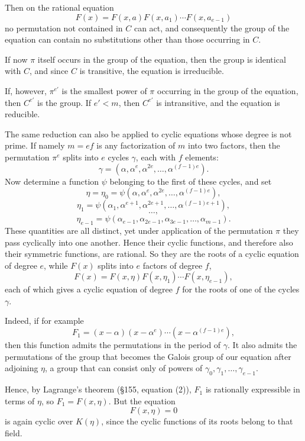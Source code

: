 \documentclass[11pt]{article}
\begin{document}
Then on the rational equation
\[
F(x)=F(x,a)F(x,a_1)\cdots F(x,a_{e-1})
\]
no permutation not contained in $C$ can act, and consequently the group of the equation can contain no substitutions other than those occurring in $C$.

If now $\pi$ itself occurs in the group of the equation, then the group is identical with $C$, and since $C$ is transitive, the equation is irreducible.

If, however, $\pi^{e'}$ is the smallest power of $\pi$ occurring in the group of the equation, then $C^{e'}$ is the group. If $e'<m$, then $C^{e'}$ is intransitive, and the equation is reducible.

The same reduction can also be applied to cyclic equations whose degree is not prime. If namely $m=ef$ is any factorization of $m$ into two factors, then the permutation $\pi^e$ splits into $e$ cycles $\gamma$, each with $f$ elements:
\[
\gamma=(\alpha,\alpha^e,\alpha^{2e},\dots,\alpha^{(f-1)e}).
\tag{9}
\]
Now determine a function $\psi$ belonging to the first of these cycles, and set
\[
\eta=\eta_0=\psi(\alpha,\alpha^e,\alpha^{2e},\dots,\alpha^{(f-1)e}),
\]
\[
\eta_1=\psi(\alpha_1,\alpha^{e+1},\alpha^{2e+1},\dots,\alpha^{(f-1)e+1}),
\]
\[
\dots,
\]
\[
\eta_{e-1}=\psi(\alpha_{e-1},\alpha_{2e-1},\alpha_{3e-1},\dots,\alpha_{m-1}).
\tag{10}
\]
These quantities are all distinct, yet under application of the permutation $\pi$ they pass cyclically into one another. Hence their cyclic functions, and therefore also their symmetric functions, are rational. So they are the roots of a cyclic equation of degree $e$, while $F(x)$ splits into $e$ factors of degree $f$,
\[
F(x)=F(x,\eta)F(x,\eta_1)\cdots F(x,\eta_{e-1}),
\]
each of which gives a cyclic equation of degree $f$ for the roots of one of the cycles $\gamma$.

Indeed, if for example
\[
F_1=(x-\alpha)(x-\alpha^e)\cdots(x-\alpha^{(f-1)e}),
\]
then this function admits the permutations in the period of $\gamma$. It also admits the permutations of the group that becomes the Galois group of our equation after adjoining $\eta$, a group that can consist only of powers of $\gamma_0,\gamma_1,\dots,\gamma_{e-1}$.

Hence, by Lagrange's theorem (\S 155, equation (2)), $F_1$ is rationally expressible in terms of $\eta$, so $F_1=F(x,\eta)$. But the equation
\[
F(x,\eta)=0
\]
is again cyclic over $K(\eta)$, since the cyclic functions of its roots belong to that field.
\end{document}
